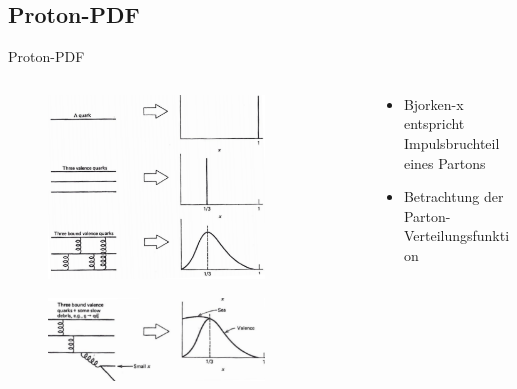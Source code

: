 \documentclass[aspectratio=1610, 9pt]{beamer}
\begin{document}
\subsection{Proton-PDF}

\begin{frame}{Proton-PDF}
\begin{columns}
  \begin{column}{0.45\textwidth}
    \begin{figure}
    \centering
    \includegraphics[width=0.8\textwidth]{images/Bjorken-1.png}
  \end{figure}
  \begin{figure}
    \centering
    \includegraphics[width=0.8\textwidth]{images/Bjorken-2.png}
  \end{figure}
  \end{column}
  \begin{column}{0.55\textwidth}
    \begin{itemize}
      \item{Bjorken-x entspricht Impulsbruchteil eines Partons}
      \item{Betrachtung der Parton-Verteilungsfunktion}
    \end{itemize}
  \end{column}
\end{columns}
\end{frame}
\end{document}
